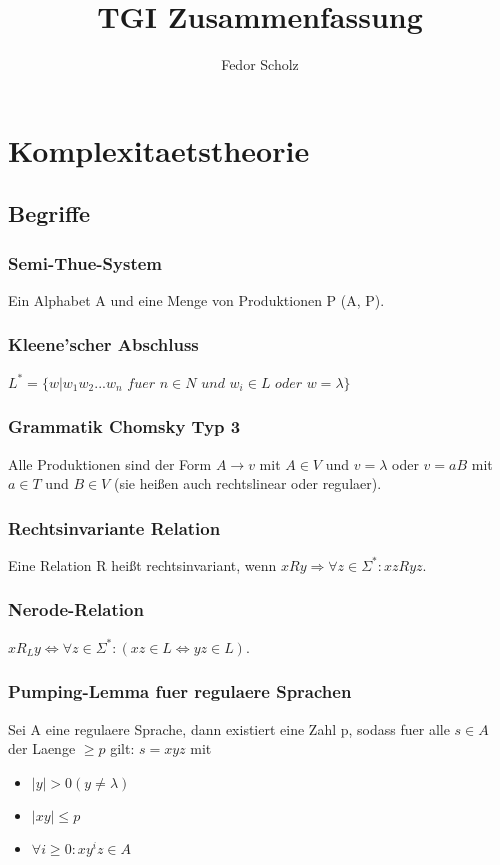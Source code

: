 \documentclass[a4paper]{scrreprt}
\begin{document}
\title{TGI Zusammenfassung}
\author{Fedor Scholz}
\maketitle

\tableofcontents
\vspace{1cm}

\chapter{Komplexitaetstheorie}



\section{Begriffe}

\subsection{Semi-Thue-System}
Ein Alphabet A und eine Menge von Produktionen P (A, P).

\subsection{Kleene'scher Abschluss}
$L^* = \{w|w_1w_2...w_n$ $fuer$ $n \in N$ $und$ $w_i \in L$ $oder$ $w = \lambda\}$

\subsection{Grammatik Chomsky Typ 3}
Alle Produktionen sind der Form $A \rightarrow v$ mit $A \in V$ und $v = \lambda$ oder $v = aB$ mit $a \in T$ und $B \in V$ (sie heißen auch rechtslinear oder regulaer).

\subsection{Rechtsinvariante Relation}
Eine Relation R heißt rechtsinvariant, wenn $xRy \Rightarrow \forall z \in \Sigma^*: xzRyz$.

\subsection{Nerode-Relation}
$xR_Ly \Leftrightarrow \forall z \in \Sigma^*: (xz \in L \Leftrightarrow yz \in L)$.

\subsection{Pumping-Lemma fuer regulaere Sprachen}
Sei A eine regulaere Sprache, dann existiert eine Zahl p, sodass fuer alle $s \in A$ der Laenge $\ge p$ gilt: $s = xyz$ mit
\begin{itemize}
	\item $|y| > 0 (y \neq \lambda)$
	\item $|xy| \le p$
	\item $\forall i \ge 0: xy^iz \in A$
\end{itemize}
\end{document}
